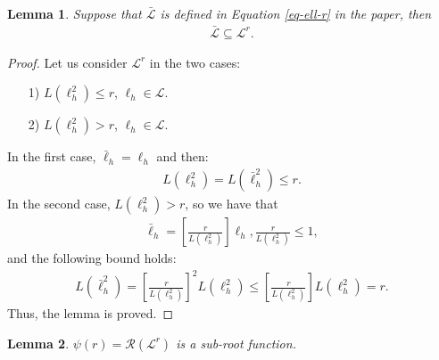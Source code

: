 \documentclass{article}
\newtheorem{lemma}{Lemma}
\begin{document}
\begin{lemma}
\label{lem-lrs-subset-lr}
  Suppose that $\bar{\mathcal{L}}$ is defined in Equation \eqref{eq-ell-r} in the paper,
  then
  \begin{align*}
    \bar{\mathcal{L}}\subseteq \mathcal{L}^r.
  \end{align*}
\end{lemma}
\begin{proof}
  Let us consider $\mathcal{L}^r$ in the two cases:
  \begin{itemize}
    \item[1)] $L(\ell_h^2)\leq r$, $\ell_h\in\mathcal{L}$.
    \item[2)] $L(\ell_h^2)>r$, $\ell_h\in\mathcal{L}$.
  \end{itemize}
  In the first case, $\bar{\ell}_h=\ell_h$ and then:
  \begin{align*}
    L(\ell_h^2)=L(\bar{\ell}_h^2)\leq r.
  \end{align*}
  In the second case, $L(\ell_h^2)>r$, so we have that
  \begin{align*}
    \bar{\ell}_h=
    \left[\frac{r}{L(\ell_h^2)}\right]\ell_h, \frac{r}{L(\ell_h^2)}\leq 1,
  \end{align*}
  and the following bound holds:
  \begin{align*}
    L(\bar{\ell}_h^2)= \left[\frac{r}{L(\ell_h^2)}
    \right]^2L(\ell_h^2)\leq \left[\frac{r}{L(\ell_h^2)}
    \right]L(\ell_h^2)= r.
  \end{align*}
  Thus, the lemma is proved.
\end{proof}
\begin{lemma}
  \label{lem-sub-root-Rademacher}
  $
    \psi(r)=\mathcal{R}(\mathcal{L}^r)
  $
  is a sub-root function.
\end{lemma}
\label{lemma-sub}
\end{document}
